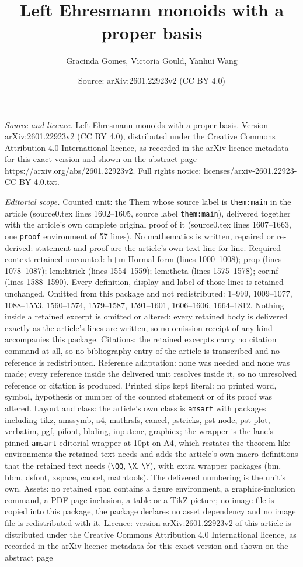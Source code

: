 \documentclass[10pt,a4paper]{amsart}
\title[Left Ehresmann monoids with a proper basis]{Left Ehresmann monoids with a proper basis}
\author{Gracinda Gomes, Victoria Gould, Yanhui Wang}
\date{Source: arXiv:2601.22923v2 (CC BY 4.0)}
\begin{document}
\maketitle

\noindent\emph{Source and licence.} Left Ehresmann monoids with a proper basis. Version arXiv:2601.22923v2 (CC BY 4.0), distributed under the Creative Commons Attribution 4.0 International licence, as recorded in the arXiv licence metadata for this exact version and shown on the abstract page https://arxiv.org/abs/2601.22923v2. Full rights notice: licenses/arxiv-2601.22923-CC-BY-4.0.txt.\par\smallskip

\noindent\textit{Editorial scope.} Counted unit: the Them whose source label is \texttt{them:main} in the article (source0.tex lines 1602--1605, source label \texttt{them:main}), delivered together with the article's own complete original proof of it (source0.tex lines 1607--1663, one \texttt{proof} environment of 57 lines). No mathematics is written, repaired or re-derived: statement and proof are the article's own text line for line. Required context retained uncounted: h+m-Hormal form (lines 1000--1008); prop (lines 1078--1087); lem:htrick (lines 1554--1559); lem:theta (lines 1575--1578); cor:nf (lines 1588--1590). Every definition, display and label of those lines is retained unchanged. Omitted from this package and not redistributed: 1--999, 1009--1077, 1088--1553, 1560--1574, 1579--1587, 1591--1601, 1606--1606, 1664--1812. Nothing inside a retained excerpt is omitted or altered: every retained body is delivered exactly as the article's lines are written, so no omission receipt of any kind accompanies this package. Citations: the retained excerpts carry no citation command at all, so no bibliography entry of the article is transcribed and no reference is redistributed. Reference adaptation: none was needed and none was made; every reference inside the delivered unit resolves inside it, so no unresolved reference or citation is produced. Printed slips kept literal: no printed word, symbol, hypothesis or number of the counted statement or of its proof was altered. Layout and class: the article's own class is \texttt{amsart} with packages including tikz, amssymb, a4, mathrsfs, cancel, pstricks, pst-node, pst-plot, verbatim, pgf, pifont, bbding, inputenc, graphicx; the wrapper is the lane's pinned \texttt{amsart} editorial wrapper at 10pt on A4, which restates the theorem-like environments the retained text needs and adds the article's own macro definitions that the retained text needs (\texttt{\textbackslash QQ}, \texttt{\textbackslash X}, \texttt{\textbackslash Y}), with extra wrapper packages (bm, bbm, dsfont, xspace, cancel, mathtools). The delivered numbering is the unit's own. Assets: no retained span contains a figure environment, a graphics-inclusion command, a PDF-page inclusion, a table or a TikZ picture; no image file is copied into this package, the package declares no asset dependency and no image file is redistributed with it. Licence: version arXiv:2601.22923v2 of this article is distributed under the Creative Commons Attribution 4.0 International licence, as recorded in the arXiv licence metadata for this exact version and shown on the abstract page 
\end{document}
